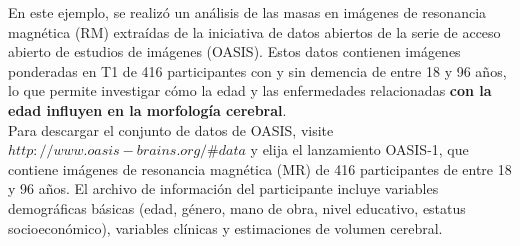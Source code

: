 \documentclass[11pt,letterpaper]{article}
\begin{document}
En este ejemplo, se realizó un análisis de las masas en imágenes de resonancia magnética (RM) extraídas de la iniciativa de datos abiertos de la serie de acceso abierto de estudios de imágenes (OASIS). Estos datos contienen imágenes ponderadas en T1 de 416 participantes con y sin demencia de entre 18 y 96 años, lo que permite investigar cómo la edad y las enfermedades relacionadas \textbf{con la edad influyen en la morfología cerebral}.\\

Para descargar el conjunto de datos de OASIS, visite $http://www.oasis-brains.org/\#data$ y elija el lanzamiento OASIS-1, que contiene imágenes de resonancia magnética (MR) de 416 participantes de entre 18 y 96 años. El archivo de información del participante incluye variables demográficas básicas (edad, género, mano de obra, nivel educativo, estatus socioeconómico), variables clínicas y estimaciones de volumen cerebral. 
\end{document}

